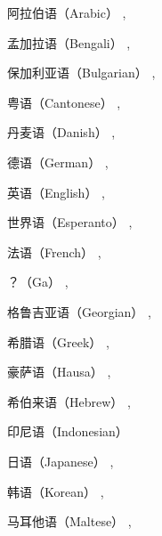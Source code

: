 \begin{itemize}
%
\item 阿拉伯语（Arabic） \citep*{HBZ2010a-u,Hahn2011a-u,MIRA2012a-u,BH2014a-u,LBL2015a-u,AHMW2015a-u},
\item 孟加拉语（Bengali） \citep*{Paul2004a-u,IHR2012a-u},
\item 保加利亚语（Bulgarian） \citep*{SOSK2004a-u,Osenova2010a-u,Osenova2010b-u,Osenova2011a-u},
\item 粤语（Cantonese） \citep*{FSB2015a-u},
\item 丹麦语（Danish） \citep{Oersnes95a,Oersnes2009a,NP2004a,MuellerPredication,MOe2011a,MuellerCopula,MOeDanish},
\item 德语（German）
\citep{%
Kiss91a,%
Netter93a-u,Netter96a,%
Meurers94,%
HMRSW97a-ed,Kordoni99a-ed-not-crossreferenced,Tseng2000a-ed,%
GK94-u,%
Keller95,%
Babel,Mueller99a,%
MK2000a,Crysmann2003b,Crysmann2005a-u,Crysmann2005c,%
MuellerLehrbuch1,%
KP2007a,KP2008a-u,Kaufmann2009a-u,Fokkens2011a}, 
\item 英语（English） \citep*{CF2000a-u,FCS2000a,Flickinger2000a,Dahlloef2002a-u,Dahlloef2003a-u,dKM2003b,MdKM2003a,DKMM2004a-u}, 
\item 世界语（Esperanto） \citep{Li96a-u},
\item 法语（French） \citep*{Tseng2003b-u},
\item ？（Ga） \citep*{KDHB2007a,Hellan2007a-u},
\item 格鲁吉亚语（Georgian） \citep{Abzianidze2011a-u},
\item 希腊语（Greek） \citep{KN2005a-u},
{\sloppy
\item 豪萨语（Hausa） \citep{Crysmann2005b-u,Crysmann2009a-u,Crysmann2011a-u,Crysmann2012a-u,Crysmann2016a},
\item 希伯来语（Hebrew） \citep*{MelnikHandWritten,HMW2013a-u,AHMW2015a-u}, 
\item 印尼语（Indonesian） \citep*{MBS2016a-u}
\item 日语（Japanese） \citep{Siegel2000a,SB2002a,BS2005a}, 
}
\item 韩语（Korean） \citep*{KY2003a-u,KY2004a-u,KY2006a,KY2009a-u,KSY2007a-u,SKBY2010a-u,KYSB2011a-u},
\item 马耳他语（Maltese） \citep{MuellerMalteseSketch},

\end{itemize}
